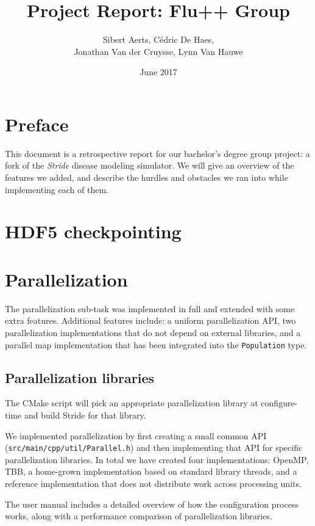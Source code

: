 \documentclass[a4paper,12pt]{article}
\title{Project Report: Flu++ Group}
\author{Sibert Aerts, C\'edric De Haes,\\ Jonathan Van der Cruysse, Lynn Van Hauwe}
\date{June 2017}
\newcommand{\sourcefile}[1]{\texttt{src/main/cpp/#1}}
\newcommand{\typename}[2]{\texttt{#2}} %
\begin{document}
\maketitle
\section*{Preface}
This document is a retrospective report for our bachelor's degree group project: a fork of the \emph{Stride} disease modeling simulator. \autocite{bachelorproef} We will give an overview of the features we added, and describe the hurdles and obstacles we ran into while implementing each of them.

\tableofcontents
\pagebreak

\section{HDF5 checkpointing}

\section{Parallelization}

The parallelization sub-task was implemented in full and extended with some extra features. Additional features include: a uniform parallelization API, two parallelization implementations that do not depend on external libraries, and a parallel map implementation that has been integrated into the \typename{stride}{Population} type.

\subsection{Parallelization libraries}

The CMake script will pick an appropriate parallelization library at configure-time and build Stride for that library.

We implemented parallelization by first creating a small common API (\sourcefile{util/Parallel.h}) and then implementing that API for specific parallelization libraries. In total we have created four implementations: OpenMP, TBB, a home-grown implementation based on standard library threads, and a reference implementation that does not distribute work across processing units.

The user manual includes a detailed overview of how the configuration process works, along with a performance comparison of parallelization libraries.
\end{document}
